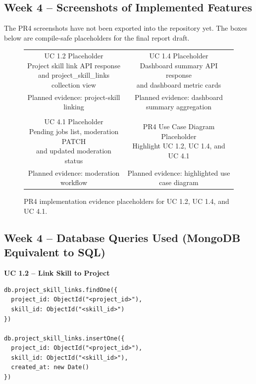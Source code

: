 \documentclass[11pt]{article}
\begin{document}
\subsection*{Week 4 -- Screenshots of Implemented Features}
\noindent
The PR4 screenshots have not been exported into the repository yet. The boxes below are compile-safe placeholders for the final report draft.

\begin{figure}[H]
  \centering
  \begin{tabular}{cc}
    \fbox{\parbox[c][2.1in][c]{0.42\linewidth}{\centering UC 1.2 Placeholder\\Project skill link API response\\and project\_skill\_links collection view}} &
    \fbox{\parbox[c][2.1in][c]{0.42\linewidth}{\centering UC 1.4 Placeholder\\Dashboard summary API response\\and dashboard metric cards}} \\
    \small Planned evidence: project-skill linking & \small Planned evidence: dashboard summary aggregation \\
    \\[0.75em]
    \fbox{\parbox[c][2.1in][c]{0.42\linewidth}{\centering UC 4.1 Placeholder\\Pending jobs list, moderation PATCH\\and updated moderation status}} &
    \fbox{\parbox[c][2.1in][c]{0.42\linewidth}{\centering PR4 Use Case Diagram Placeholder\\Highlight UC 1.2, UC 1.4, and UC 4.1}} \\
    \small Planned evidence: moderation workflow & \small Planned evidence: highlighted use case diagram \\
  \end{tabular}
  \caption{PR4 implementation evidence placeholders for UC 1.2, UC 1.4, and UC 4.1.}
\end{figure}

\subsection*{Week 4 -- Database Queries Used (MongoDB Equivalent to SQL)}

\noindent
\textbf{UC 1.2 -- Link Skill to Project}
\begin{verbatim}
db.project_skill_links.findOne({
  project_id: ObjectId("<project_id>"),
  skill_id: ObjectId("<skill_id>")
})

db.project_skill_links.insertOne({
  project_id: ObjectId("<project_id>"),
  skill_id: ObjectId("<skill_id>"),
  created_at: new Date()
})
\end{verbatim}
\end{document}
